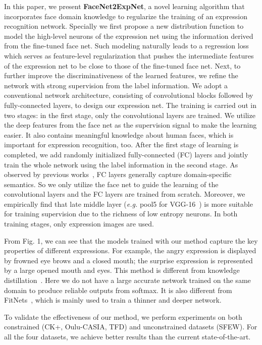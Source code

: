 \documentclass[a4paper, 10pt, conference]{ieeeconf}      %
\begin{document}
   
In this paper, we present \textbf{FaceNet2ExpNet}, a novel learning algorithm that incorporates face domain knowledge to regularize the training of an expression recognition network. 
Specially we first propose a new distribution function to model the high-level neurons of the expression net using the information derived from the fine-tuned face net. 
Such modeling naturally leads to a regression loss which serves as feature-level regularization that pushes the intermediate features of the expression net to be close to those of the fine-tuned face net. Next, to further improve the discriminativeness of the learned features, we refine the network with strong supervision from the label information. 
We adopt a conventional network architecture, consisting of convolutional blocks followed by fully-connected layers, to design our expression net.
The training is carried out in two stages: 
in the first stage, only the convolutional layers are trained. We utilize the deep features from the face net as the supervision signal to make the learning easier. It also contains meaningful knowledge about human faces, which is important for expression recognition, too. 
After the first stage of learning is completed,  we add randomly initialized fully-connected (FC) layers and jointly train the whole network using the label information in the second stage. As observed by previous works~\cite{vittayakorn2016automatic}, FC layers generally capture domain-specific semantics. So we only utilize the face net to guide the learning of the convolutional layers and the FC layers are trained from scratch. Moreover, we empirically find that late middle layer (\emph{e.g.} pool5 for VGG-16~\cite{Simonyan14c}) is more suitable for training supervision due to the richness of low entropy neurons.
In both training stages, only expression images are used.

From Fig. 1, we can see that the models trained with our method capture the key properties of different expressions. For example, the angry expression is displayed by frowned eye brows and a closed mouth; the surprise expression is represented by a large opened mouth and eyes. 
This method is different from knowledge distillation~\cite{hinton2015distilling}. Here we do not have a large accurate network trained on the same domain to produce reliable outputs from softmax. It is also different from FitNets~\cite{romero2014fitnets}, which is mainly used to train a thinner and deeper network.

To validate the effectiveness of our method, we perform experiments on both constrained (CK+, Oulu-CASIA, TFD) and unconstrained datasets (SFEW). For all the four datasets, we achieve better results than the current state-of-the-art.  
\end{document}
